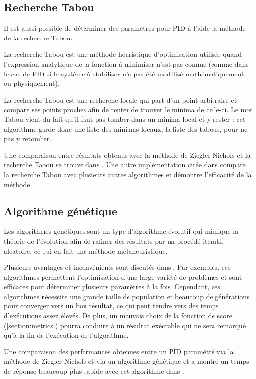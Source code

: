 \documentclass[a4paper,10pt]{report}
\begin{document}
\subsection{Recherche Tabou}

Il est aussi possible de déterminer des paramètres pour PID à l'aide la méthode de la recherche Tabou.

La recherche Tabou est une méthode heuristique d'optimisation utilisée quand l'expression analytique de la fonction à minimiser n'est pas connue
(comme dans le cas de PID si le système à stabiliser n'a pas été modélisé mathématiquement ou physiquement).

La recherche Tabou est une recherche locale qui part d'un point arbitraire et compare ses points proches afin de tenter de trouver le minima de celle-ci.
Le mot Tabou vient du fait qu'il faut pas tomber dans un minima local et y rester :
cet algorithme garde donc une liste des minimas locaux, la liste des tabous, pour ne pas y retomber.

Une comparaison entre résultats obtenus avec la méthode de Ziegler-Nichols et la recherche Tabou se trouve dans \cite{Karaboga569754}.
Une autre implémentation citée dans \cite{bagis2011tabu} compare la recherche Tabou avec plusieurs autres algorithmes et démontre l'efficacité de la méthode.

\subsection{Algorithme génétique}

Les algorithmes génétiques sont un type d'algorithme évolutif qui mimique la théorie de l'évolution afin de rafiner des résultats par un procédé iteratif aléatoire, ce qui en fait une méthode métaheuristique.

Plusieurs avantages et inconvénients sont discutés dans \cite{Tabassum2014}.
Par exemples, ces algorithmes permettent l'optimisation d'une large variété de problèmes et sont efficaces pour déterminer plusieurs paramètres à la fois.
Cependant, ces algorithmes nécessite une grande taille de population et beaucoup de générations pour converger vers un bon résultat, ce qui peut tendre vers des temps d'exécutions assez élevés.
De plus, un mauvais choix de la fonction de score (\ref{section:metrics}) pourra conduire à un résultat exécrable qui ne sera remarqué qu'à la fin de l'exécution de l'algorithme.

Une comparaison des performances obtenues entre un PID paramétré via la méthode de Ziegler-Nichols et via un algorithme génétique et a montré un temps de réponse beaucoup plus rapide avec cet algorithme dans \cite{thomas2009position}.
\end{document}
